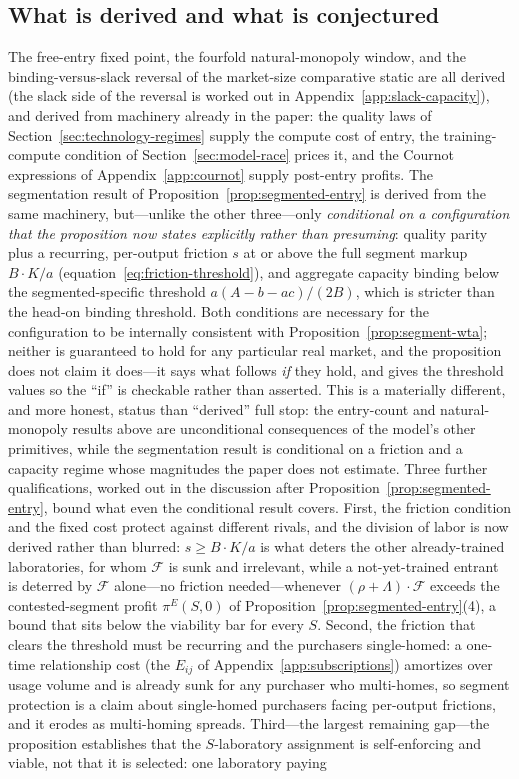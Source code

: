 \documentclass[11pt]{article}
\begin{document}
\subsection{What is derived and what is conjectured}
\label{subsec:entry-honesty}

The free-entry fixed point, the fourfold natural-monopoly window, and the binding-versus-slack reversal of the market-size comparative static are all derived (the slack side of the reversal is worked out in Appendix~\ref{app:slack-capacity}), and derived from machinery already in the paper: the quality laws of Section~\ref{sec:technology-regimes} supply the compute cost of entry, the training-compute condition of Section~\ref{sec:model-race} prices it, and the Cournot expressions of Appendix~\ref{app:cournot} supply post-entry profits. The segmentation result of Proposition~\ref{prop:segmented-entry} is derived from the same machinery, but---unlike the other three---only \emph{conditional on a configuration that the proposition now states explicitly rather than presuming}: quality parity plus a recurring, per-output friction $s$ at or above the full segment markup $B\cdot K/a$ (equation~\eqref{eq:friction-threshold}), and aggregate capacity binding below the segmented-specific threshold $a(A-b-ac)/(2B)$, which is stricter than the head-on binding threshold. Both conditions are necessary for the configuration to be internally consistent with Proposition~\ref{prop:segment-wta}; neither is guaranteed to hold for any particular real market, and the proposition does not claim it does---it says what follows \emph{if} they hold, and gives the threshold values so the ``if'' is checkable rather than asserted. This is a materially different, and more honest, status than ``derived'' full stop: the entry-count and natural-monopoly results above are unconditional consequences of the model's other primitives, while the segmentation result is conditional on a friction and a capacity regime whose magnitudes the paper does not estimate. Three further qualifications, worked out in the discussion after Proposition~\ref{prop:segmented-entry}, bound what even the conditional result covers. First, the friction condition and the fixed cost protect against different rivals, and the division of labor is now derived rather than blurred: $s\geq B\cdot K/a$ is what deters the other already-trained laboratories, for whom $\mathcal F$ is sunk and irrelevant, while a not-yet-trained entrant is deterred by $\mathcal F$ alone---no friction needed---whenever $(\rho+\Lambda)\cdot\mathcal F$ exceeds the contested-segment profit $\pi^{E}(S,0)$ of Proposition~\ref{prop:segmented-entry}(4), a bound that sits below the viability bar for every $S$. Second, the friction that clears the threshold must be recurring and the purchasers single-homed: a one-time relationship cost (the $E_{ij}$ of Appendix~\ref{app:subscriptions}) amortizes over usage volume and is already sunk for any purchaser who multi-homes, so segment protection is a claim about single-homed purchasers facing per-output frictions, and it erodes as multi-homing spreads. Third---the largest remaining gap---the proposition establishes that the $S$-laboratory assignment is self-enforcing and viable, not that it is selected: one laboratory paying 
\end{document}
